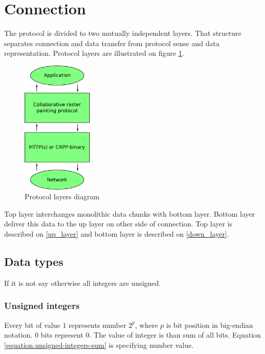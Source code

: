 \part{Connection}
\label{connection}

The protocol is divided to two mutually independent layers. That structure separates connection and data transfer from protocol sense and data representation. Protocol layers are illustrated on figure \ref{connection.pictures.protocol_layers}.


\begin{figure}[h]
  \centering
  \includegraphics[width=0.30\textwidth]{diagrams/protocol_layers.png}
  \caption{Protocol layers diagram}
  \label{connection.pictures.protocol_layers}
\end{figure}

Top layer interchanges monolithic data chunks with bottom layer. Bottom layer deliver this data to the up layer on other side of connection. Top layer is described on \ref{up_layer} and bottom layer is described on \ref{down_layer}.

\chapter{Data types}
\label{connection.data_types}

If it is not say otherwise all integers are unsigned.

\section{Unsigned integers}
\label{connection.data_types.unsigned_integer}

Every bit of value $1$ represents number $2^{p}$, where $p$ is bit position in big-endian notation. $0$ bits represent $0$. The value of integer is than sum of all bits. Equation \ref{equation.unsigned-integers-sum} is specifying number value.

